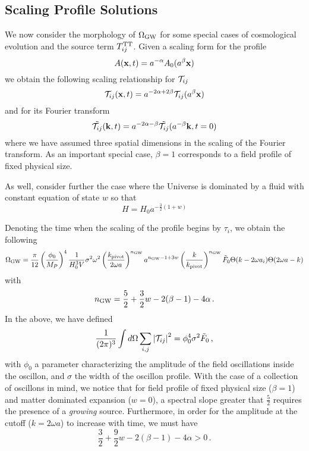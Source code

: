 \documentclass{revtex4}
\begin{document}
\subsection{Scaling Profile Solutions}
We now consider the morphology of $\Omega_{\rm GW}$ for some special cases of cosmological evolution and the source term $T_{ij}^{{\rm TT}}$.
Given a scaling form for the profile
\begin{equation}
  A({\bf x},t) = a^{-\alpha} A_0(a^\beta{\bf x})
\end{equation}
we obtain the following scaling relationship for $\mathcal{T}_{ij}$
\begin{equation}
  \mathcal{T}_{ij}({\bf x},t) = a^{-2\alpha+2\beta}\mathcal{T}_{ij}(a^\beta{\bf x})
\end{equation}
and for its Fourier transform
\begin{equation}
  \tilde{\mathcal{T}_{ij}}({\bf k},t) = a^{-2\alpha-\beta}\tilde{\mathcal{T}_{ij}}(a^{-\beta}{\bf k},t=0)
\end{equation}
where we have assumed three spatial dimensions in the scaling of the Fourier transform.
As an important special case, $\beta=1$ corresponds to a field profile of fixed physical size.

As well, consider further the case where the Universe is dominated by a fluid with constant equation of state $w$ so that
\begin{equation}
  H = H_0 a^{-\frac{3}{2}(1+w)}
\end{equation}

Denoting the time when the scaling of the profile begins by $\tau_i$, we obtain the following
\begin{equation}
  \Omega_{\rm GW} = \frac{\pi}{12}\left(\frac{\phi_0}{M_P}\right)^4\frac{1}{H_0^3V}\sigma^2\omega^2\left(\frac{k_{\rm pivot}}{2\omega a}\right)^{n_{\rm GW}}a^{n_{\rm GW} - 1 + 3w}\left(\frac{k}{k_{\rm pivot}}\right)^{n_{\rm GW}} \tilde{F}_0 \Theta(k-2\omega a_i)\Theta(2\omega a - k)
\end{equation}
with
\begin{equation}
  n_{\rm GW} = \frac{5}{2} + \frac{3}{2}w - 2(\beta-1) - 4\alpha \, .
\end{equation}
In the above, we have defined
\begin{equation}
  \frac{1}{(2\pi)^3}\int d\Omega \sum_{i,j}\left|\mathcal{T}_{ij}\right|^2 = \phi_0^4\sigma^2 \tilde{F}_0 \, ,
\end{equation}
with $\phi_0$ a parameter characterizing the amplitude of the field oscillations inside the oscillon, and $\sigma$ the width of the oscillon profile. 
With the case of a collection of oscillons in mind, we notice that for field profile of fixed physical size ($\beta=1$) and matter dominated expansion ($w=0$), a spectral slope greater that $\frac{5}{2}$ requires the presence of a \emph{growing} source.
Furthermore, in order for the amplitude at the cutoff ($k=2\omega a$) to increase with time, we must have
\begin{equation}
  \frac{3}{2} + \frac{9}{2}w - 2(\beta-1) - 4\alpha > 0 \, .
\end{equation}
\end{document}
